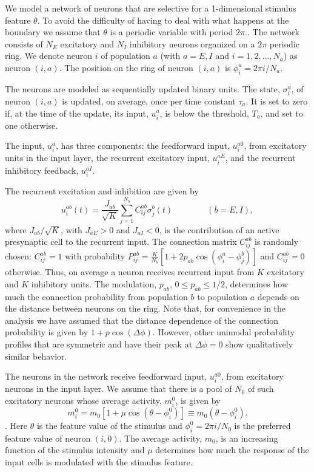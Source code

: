 We model a network of neurons that are selective for a 1-dimensional stimulus 
feature $\theta$\@. To avoid the difficulty of having to deal with what happens
at the boundary we assume that $\theta$ is a periodic  variable with period 
$2\pi$\@.. 
The network consists of $N_E$ excitatory and $N_I$ inhibitory 
neurons organized on a $2\pi$ periodic ring. We denote neuron $i$ of 
population $a$ (with $a=E,I$ and $i=1,2,\ldots,N_a$) as neuron $(i,a)$. 
The position on the ring of neuron $(i,a)$ is $\phi_i^a=2\pi i/N_a$.

The neurons are modeled as sequentially updated
binary units. The state, $\sigma_i^a$, of neuron $(i,a)$ is updated, 
on average, once per time constant $\tau_a$\@. It is set to zero if, at the 
time of the update, its input, $u_i^a$, is below the threshold, $T_a$, 
and set to one otherwise.

The input, $u_i^a$, has three components: the feedforward input, $u_i^{a0}$, 
from excitatory units in the input layer, the recurrent excitatory input, 
$u_i^{aE}$, and the recurrent inhibitory feedback, $u_i^{aI}$\@. 

The recurrent excitation and inhibition are given by
\begin{equation}
u_i^{ab}(t)=\frac{J_{ab}}{\sqrt{K}}\sum_{j=1}^{N_b}C_{ij}^{ab}\sigma_j^b(t)
\qquad \qquad (b=E,I),
\end{equation}
where $J_{ab}/\sqrt{K}$, with $J_{aE}>0$ and $J_{aI}<0$, is the contribution 
of an active presynaptic cell to the recurrent input.
The connection matrix $C_{ij}^{ab}$ is randomly chosen: $C_{ij}^{ab}=1$ 
with probability $P_{ij}^{ab}=\frac{K}{N_b}[1+2p_{ab}\cos (\phi_i^a-\phi_j^b)]$
and $C_{ij}^{ab}=0$ otherwise. Thus, on average a neuron receives recurrent 
input from $K$ excitatory and $K$ inhibitory units. The modulation, $p_{ab}$, 
$0\leq p_{ab} \leq 1/2$, determines how much the connection probability from 
population $b$ to population $a$ depends on the distance between neurons on 
the ring. Note that, for convenience in the analysis we have assumed that the 
distance dependence of the connection probability is given by 
$1+p\cos(\Delta \phi)$. However, other unimodal probability profiles that are 
symmetric and have their peak at $\Delta\phi=0$ show qualitatively similar 
behavior.

The neurons in the network receive feedforward input, $u_i^{a0}$, from 
excitatory neurons in the input layer.
We assume that there is a pool of $N_0$ of such excitatory neurons 
whose average activity, $m_i^0$, is given by
\begin{equation}
m_i^0=m_0[1+\mu\cos (\theta-\phi_i^0)]\equiv m_0(\theta-\phi_i^0).
\end{equation}.
Here $\theta$ is the feature value of the stimulus and $\phi_i^0=2\pi i/N_0$ 
is the preferred feature value of neuron $(i,0)$\@. The average activity, 
$m_0$, is an increasing function of the stimulus intensity and $\mu$ determines 
how much the response of the input cells is modulated with the stimulus feature.

